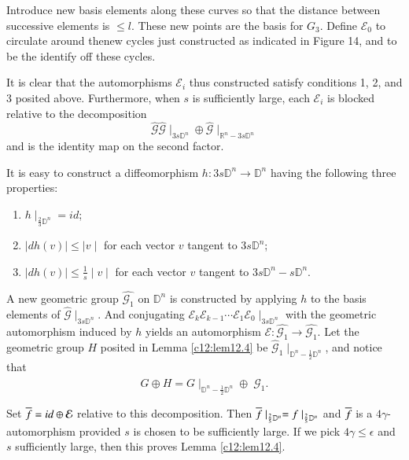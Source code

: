 Introduce new basis elements along these curves so that the distance
between successive elements is $\leq l$. These new points are the
basis for $G_3$. Define $\mathcal{E}_0$ to circulate around
the\pageoriginale new cycles just constructed as indicated in Figure
14, and to be  the identify off these cycles.

It is clear that the automorphisms $\mathcal{E}_i$ thus constructed
satisfy conditions 1, 2, and 3 posited above. Furthermore, when $s$ is
sufficiently large, each $\mathcal{E}_i$ is blocked relative to the
decomposition
$$
\hat{\mathcal{G}} \hat{\mathcal{G}} \mid_{3 s\mathbb{D}^n} \oplus
\hat{\mathcal{G}}\mid_{\mathbb{R}^n - 3 s\mathbb{D}^n} 
$$
and is the identity map on the second factor.

It is easy to construct a diffeomorphism $h: 3 s\mathbb{D}^n \to
\mathbb{D}^n$ having the following three properties:
\begin{enumerate}
\item $h\mid_{\frac{2}{3} \mathbb{D}^n} = id$;
  \item $|dh (v)| \leq \mid v \mid$ for each vector $v$ tangent to $3
    s\mathbb{D}^n$;
    \item $|dh (v)| \leq \frac{1}{s} \mid v\mid$ for each vector $v$
      tangent to $3 s\mathbb{D}^n - s\mathbb{D}^n$.
\end{enumerate}

A new geometric group $\hat{\mathcal{G}_1}$ on $\mathbb{D}^n$ is
constructed by applying $h$ to the basis elements of
$\hat{\mathcal{G}}\mid_{3 s \mathbb{D}^n}$. And conjugating
$\mathcal{E}_k \mathcal{E}_{k-1}\cdots \mathcal{E}_1 \mathcal{E}_0
\mid_{3 s \mathbb{D}^n}$ with the geometric automorphism induced by
$h$ yields an automorphism $\mathcal{E} : \hat{\mathcal{G}_1} \to
  \hat{\mathcal{G}_1}$. Let the geometric group $H$ posited in Lemma
  \ref{c12:lem12.4} be $\hat{\mathcal{G}}_1 \mid_{\mathbb{D}^n -
    \frac{1}{2} \mathbb{D}^n}$, and notice that 
$$
G \oplus H = G\mid_{\mathbb{D}^n - \frac{1}{2} \mathbb{D}^n} \oplus\;
\hat{\mathcal{G}}_1.
$$

Set $\overline{f} =id \oplus \mathcal{E}$ relative to this
decomposition. Then $\overline{f} \mid_{\frac{2}{5}\mathbb{D}^n}
=f\mid_{\frac{2}{5} \mathbb{D}^n}$ and $\overline{f}$ is a $4
\gamma$-automorphism provided $s$ is chosen to be sufficiently
large. If we pick $4 \gamma \leq \epsilon$ and $s$ sufficiently large,
then this proves Lemma \ref{c12:lem12.4}.

